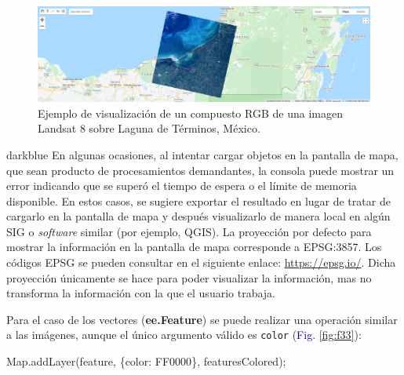 \documentclass[
  12pt,
  letterpaper,
  twoside]{book}
\newenvironment{Shaded}{\begin{snugshade}}{\end{snugshade}}
\newcommand{\DataTypeTok}[1]{\textcolor[rgb]{0.00,0.00,0.00}{#1}}
\newcommand{\FunctionTok}[1]{\textcolor[rgb]{0.48,0.12,0.64}{#1}}
\newcommand{\KeywordTok}[1]{\textcolor[rgb]{0.48,0.12,0.64}{#1}}
\newcommand{\NormalTok}[1]{#1}
\newcommand{\OperatorTok}[1]{\textcolor[rgb]{0.00,0.00,0.00}{#1}}
\newcommand{\StringTok}[1]{\textcolor[rgb]{0.87,0.29,0.22}{#1}}
\newcommand\boldpurple[1]{\textcolor{darkpurple}{\textbf{#1}}}
\begin{document}
\begin{figure}[H]

{\centering \includegraphics[width=0.95\linewidth]{Img/LTerminos} 

}

\caption{Ejemplo de visualización de un compuesto RGB de una imagen Landsat 8 sobre Laguna de Términos, México.}\label{fig:f32}
\end{figure}

\begin{bluebox2}

\begin{awesomeblock}{5pt}{\faLightbulb}{darkblue}
En algunas ocasiones, al intentar cargar objetos en la pantalla de mapa, que sean producto de procesamientos demandantes, la consola puede mostrar un error indicando que se superó el tiempo de espera o el límite de memoria disponible. En estos casos, se sugiere exportar el resultado en lugar de tratar de cargarlo en la pantalla de mapa y después visualizarlo de manera local en algún SIG o \emph{software} similar (por ejemplo, QGIS).
La proyección por defecto para mostrar la información en la pantalla de mapa corresponde a EPSG:3857. Los códigos EPSG se pueden consultar en el siguiente enlace: \url{https://epsg.io/}. Dicha proyección únicamente se hace para poder visualizar la información, mas no transforma la información con la que el usuario trabaja.

\end{awesomeblock}

\end{bluebox2}

Para el caso de los vectores (\boldpurple{ee.Feature}) se puede realizar una operación similar a las imágenes, aunque el único argumento válido es \texttt{color} (\textcolor{darkblue}{Fig.} \ref{fig:f33}):

\begin{Shaded}
\begin{Highlighting}[]
\KeywordTok{Map}\OperatorTok{.}\FunctionTok{addLayer}\NormalTok{(feature}\OperatorTok{,}\NormalTok{ \{}\DataTypeTok{color}\OperatorTok{:} \StringTok{\textquotesingle{}FF0000\textquotesingle{}}\NormalTok{\}}\OperatorTok{,} \StringTok{\textquotesingle{}featuresColored\textquotesingle{}}\NormalTok{)}\OperatorTok{;}
\end{Highlighting}
\end{Shaded}
\end{document}
